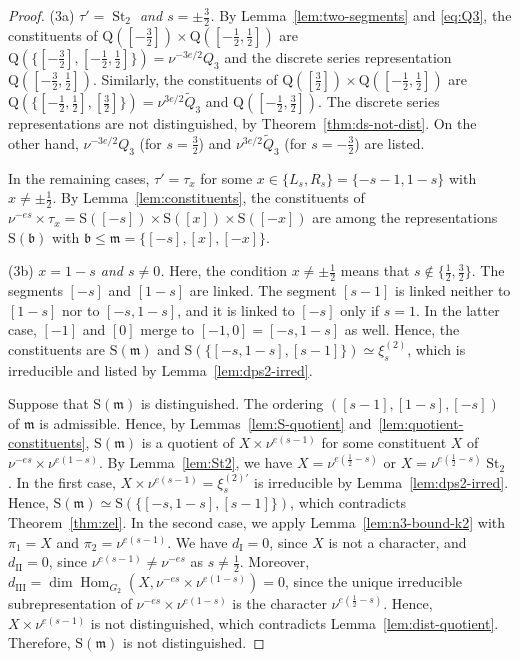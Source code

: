 \documentclass[11pt]{amsart}
\numberwithin{equation}{section}
\theoremstyle{plain}
\theoremstyle{definition}
\theoremstyle{remark}
\DeclareMathOperator{\Hom}{Hom}
\DeclareMathOperator{\St}{St}
\newcommand{\Qt}{\widetilde{Q}}
\newcommand{\xitwo}{\xi^{(2)}}
\newcommand{\mm}{\mathfrak{m}}
\newcommand{\bb}{\mathfrak{b}}
\newcommand{\Ss}{\mathrm{S}}
\newcommand{\Qq}{\mathrm{Q}}
\newcommand{\dI}{d_{\mathrm{I}}}
\newcommand{\dII}{d_{\mathrm{II}}}
\newcommand{\dIII}{d_{\mathrm{III}}}
\begin{document}
\begin{proof}
	(3a) \emph{$\tau'=\St_2$ and $s=\pm\frac32$.} By Lemma~\ref{lem:two-segments} and \eqref{eq:Q3}, the constituents of $\Qq([-\frac32])\times\Qq([-\frac12,\frac12])$ are $\Qq(\{[-\frac32],[-\frac12,\frac12]\})=\nu^{-3e/2}Q_3$ and the discrete series representation $\Qq([-\frac32,\frac12])$. Similarly, the constituents of $\Qq([\frac32])\times\Qq([-\frac12,\frac12])$ are $\Qq(\{[-\frac12,\frac12],[\frac32]\})=\nu^{3e/2}\Qt_3$ and $\Qq([-\frac12,\frac32])$. The discrete series representations are not distinguished, by Theorem~\ref{thm:ds-not-dist}. On the other hand, $\nu^{-3e/2}Q_3$ (for $s=\frac32$) and $\nu^{3e/2}\Qt_3$ (for $s=-\frac32$) are listed.
	
	In the remaining cases, $\tau'=\tau_x$ for some $x\in\{L_s,R_s\}=\{-s-1,1-s\}$ with $x\ne\pm\frac12$. By Lemma~\ref{lem:constituents}, the constituents of $\nu^{-es}\times\tau_x=\Ss([-s])\times\Ss([x])\times\Ss([-x])$ are among the representations $\Ss(\bb)$ with $\bb\le\mm=\{[-s],[x],[-x]\}$.
	
	(3b) \emph{$x=1-s$ and $s\ne0$.} Here, the condition $x\ne\pm\frac12$ means that $s\notin\{\frac12,\frac32\}$. The segments $[-s]$ and $[1-s]$ are linked. The segment $[s-1]$ is linked neither to $[1-s]$ nor to $[-s,1-s]$, and it is linked to $[-s]$ only if $s=1$. In the latter case, $[-1]$ and $[0]$ merge to $[-1,0]=[-s,1-s]$ as well. Hence, the constituents are $\Ss(\mm)$ and $\Ss(\{[-s,1-s],[s-1]\})\simeq\xitwo_s$, which is irreducible and listed by Lemma~\ref{lem:dps2-irred}.
	
	Suppose that $\Ss(\mm)$ is distinguished. The ordering $([s-1],[1-s],[-s])$ of $\mm$ is admissible. Hence, by Lemmas~\ref{lem:S-quotient} and~\ref{lem:quotient-constituents}, $\Ss(\mm)$ is a quotient of $X\times\nu^{e(s-1)}$ for some constituent $X$ of $\nu^{-es}\times\nu^{e(1-s)}$. By Lemma~\ref{lem:St2}, we have $X=\nu^{e(\frac12-s)}$ or $X=\nu^{e(\frac12-s)}\St_2$. In the first case, $X\times\nu^{e(s-1)}=\xi^{(2)\prime}_s$ is irreducible by Lemma~\ref{lem:dps2-irred}. Hence, $\Ss(\mm)\simeq\Ss(\{[-s,1-s],[s-1]\})$, which contradicts Theorem~\ref{thm:zel}. In the second case, we apply Lemma~\ref{lem:n3-bound-k2} with $\pi_1=X$ and $\pi_2=\nu^{e(s-1)}$. We have $\dI=0$, since $X$ is not a character, and $\dII=0$, since $\nu^{e(s-1)}\ne\nu^{-es}$ as $s\ne\frac12$. Moreover, $\dIII=\dim\Hom_{G_2}(X,\nu^{-es}\times\nu^{e(1-s)})=0$, since the unique irreducible subrepresentation of $\nu^{-es}\times\nu^{e(1-s)}$ is the character $\nu^{e(\frac12-s)}$. Hence, $X\times\nu^{e(s-1)}$ is not distinguished, which contradicts Lemma~\ref{lem:dist-quotient}. Therefore, $\Ss(\mm)$ is not distinguished.
	

\end{proof}
\end{document}
